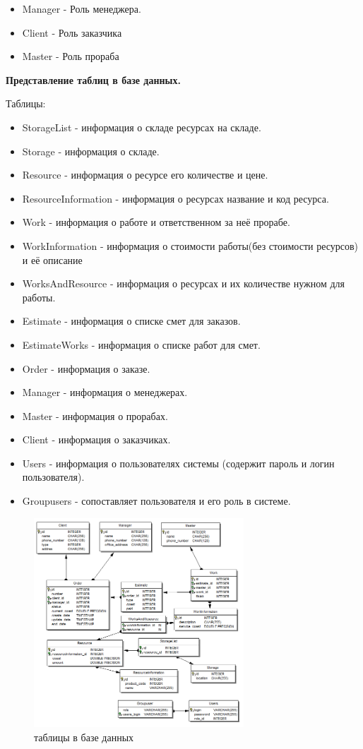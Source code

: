 \begin{itemize}
\item Manager - Роль менеджера.
\item Client - Роль заказчика
\item Master - Роль прораба
\end{itemize}

\textbf{Представление таблиц в базе данных.}

Таблицы:
\begin{itemize}
\item StorageList - информация о складе ресурсах на складе.
\item Storage - информация о складе.
\item Resource - информация о ресурсе его количестве и цене.
\item ResourceInformation - информация о ресурсах название и код ресурса.
\item Work - информация о работе и ответственном за неё прорабе.
\item WorkInformation - информация о стоимости работы(без стоимости ресурсов) и её описание
\item WorksAndResource - информация о ресурсах и их количестве нужном для работы.
\item Estimate - информация о списке смет для заказов.
\item EstimateWorks - информация о списке работ для смет.
\item Order - информация о заказе.
\item Manager - информация о менеджерах.
\item Master - информация о прорабах.
\item Client - информация о заказчиках.
\item Users - информация о пользователях системы (содержит пароль и логин пользователя).
\item Groupusers - сопоставляет пользователя и его роль в системе.
\end{itemize}

\begin{figure}[!ht]
	\centering
	\includegraphics[width=0.7\textwidth]{img/database.png}
	\caption{таблицы в базе данных}
\end{figure}

